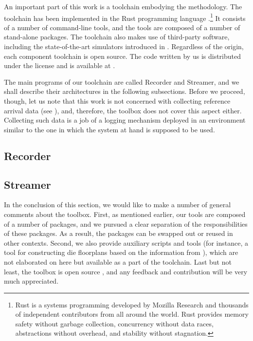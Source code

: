An important part of this work is a toolchain embodying the methodology. The
toolchain has been implemented in the Rust programming language
\cite{rust}.\footnote{Rust is a systems programming developed by Mozilla
Research and thousands of independent contributors from all around the world.
Rust provides memory safety without garbage collection, concurrency without data
races, abstractions without overhead, and stability without stagnation.} It
consists of a number of command-line tools, and the tools are composed of a
number of stand-alone packages. The toolchain also makes use of third-party
software, including the state-of-the-art simulators introduced in
. Regardless of the origin, each component toolchain is open
source. The code written by us is distributed under the  license
\cite{mit} and is available at \cite{sources}.

The main programs of our toolchain are called Recorder and Streamer, and we
shall describe their architectures in the following subsections. Before we
proceed, though, let us note that this work is not concerned with collecting
reference arrival data (see ), and, therefore, the toolbox does
not cover this aspect either. Collecting such data is a job of a logging
mechanism deployed in an environment similar to the one in which the system at
hand is supposed to be used.

\subsection{Recorder} 


\subsection{Streamer} 


In the conclusion of this section, we would like to make a number of general
comments about the toolbox. First, as mentioned earlier, our tools are composed
of a number of packages, and we pursued a clear separation of the
responsibilities of these packages. As a result, the packages can be swapped out
or reused in other contexts. Second, we also provide auxiliary scripts and tools
(for instance, a tool for constructing die floorplans based on the information
from ), which are not elaborated on here but available as a part of
the toolchain. Last but not least, the toolbox is open source \cite{sources},
and any feedback and contribution will be very much appreciated.
